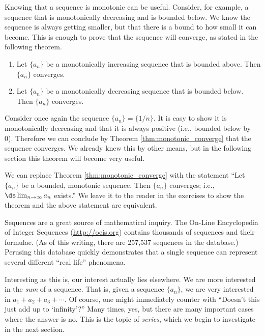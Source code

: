 
Knowing that a sequence is monotonic can be useful. %
Consider, for example, a sequence that is monotonically decreasing and is bounded below. We know the sequence is always getting smaller, but that there is a bound to how small it can become. This is enough to prove that the sequence will converge, as stated in the following theorem.

{\begin{enumerate}
\item		Let $\{a_n\}$ be a monotonically increasing sequence that is bounded above. Then $\{a_n\}$ converges.
\item		Let $\{a_n\}$ be a monotonically decreasing sequence that is bounded below. Then $\{a_n\}$ converges.
\end{enumerate}
}

Consider once again the sequence $\{a_n\} = \{1/n\}$. It is easy to show it is monotonically decreasing and that it is always positive (i.e., bounded below by 0). Therefore we can conclude by Theorem \ref{thm:monotonic_converge} that the sequence converges. We already knew this by other means, but in the following section this theorem will become very useful.

We can replace Theorem \ref{thm:monotonic_converge} with the statement ``Let $\{a_n\}$ be a bounded, monotonic sequence. Then $\{a_n\}$ converges; i.e., $\ds \lim_{n \to\infty}a_n$ exists.'' We leave it to the reader in the exercises to show the theorem and the above statement are equivalent.

Sequences are a great source of mathematical inquiry. The On-Line Encyclopedia of Integer Sequences (\url{http://oeis.org}) contains thousands of sequences and their formulae. (As of this writing, there are 257,537 sequences in the database.) Perusing this database quickly demonstrates that a single sequence can represent several different ``real life'' phenomena. 

Interesting as this is, our interest actually lies elsewhere. We are more interested in the \emph{sum} of a sequence. That is, given a sequence $\{a_n\}$, we are very interested in $a_1+a_2+a_3+\cdots$. Of course, one might immediately counter with ``Doesn't this just add up to `infinity'?'' Many times, yes, but there are many important cases where the answer is no. This is the topic of \emph{series}, which we begin to investigate in the next section.

